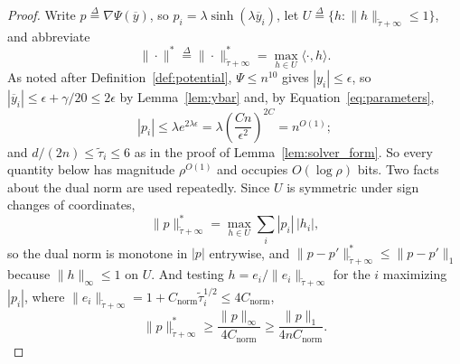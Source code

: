 \documentclass[11pt]{article}
\newcommand{\tautil}{\widetilde{\tau}}
\newcommand{\defeq}{\stackrel{\Delta}{=}}
\newcommand{\Cnorm}{C_{\mathrm{norm}}}
\begin{document}
\begin{proof}
Write $p \defeq \nabla \Psi(\overline{y})$, so
$p_i = \lambda \sinh(\lambda \overline{y}_i)$, let
$U \defeq \{ h : \|h\|_{\tautil + \infty} \le 1 \}$, and abbreviate
\[
\|\cdot\|^{*}
\defeq
\|\cdot\|^{*}_{\tautil + \infty}
=
\max_{h \in U} \langle \cdot, h \rangle .
\]
As noted after Definition~\ref{def:potential}, $\Psi \le n^{10}$ gives
$|y_i| \le \epsilon$, so
$|\overline{y}_i| \le \epsilon + \gamma / 20 \le 2 \epsilon$ by
Lemma~\ref{lem:ybar} and, by Equation~\eqref{eq:parameters},
\[
|p_i|
\le
\lambda e^{2 \lambda \epsilon}
=
\lambda \left( \frac{C n}{\epsilon^2} \right)^{2 C}
=
n^{O(1)} ;
\]
and $d / (2 n) \le \tautil_i \le 6$ as in the proof of
Lemma~\ref{lem:solver_form}.
So every quantity below has magnitude $\rho^{O(1)}$ and occupies
$O(\log \rho)$ bits.
Two facts about the dual norm are used repeatedly.
Since $U$ is symmetric under sign changes of coordinates,
\begin{equation}
\label{eq:dual_abs}
\|p\|^{*}_{\tautil + \infty}
=
\max_{h \in U} \sum_i |p_i| \, |h_i| ,
\end{equation}
so the dual norm is monotone in $|p|$ entrywise, and
$\|p - p'\|^{*}_{\tautil + \infty} \le \|p - p'\|_1$ because
$\|h\|_{\infty} \le 1$ on
$U$.
And testing $h = e_i / \|e_i\|_{\tautil + \infty}$ for the
$i$ maximizing
$|p_i|$, where
$\|e_i\|_{\tautil + \infty} = 1 + \Cnorm \tautil_i^{1/2} \le 4 \Cnorm$,
\begin{equation}
\label{eq:dual_lower}
\|p\|^{*}_{\tautil + \infty}
\ge
\frac{\|p\|_{\infty}}{4 \Cnorm}
\ge
\frac{\|p\|_{1}}{4 n \Cnorm} .
\end{equation}


\end{proof}
\end{document}
